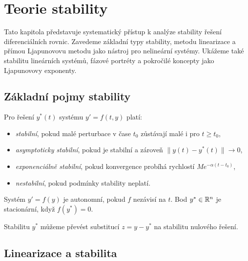 \section{Teorie stability}
\label{sec:teorie-stability}

Tato kapitola představuje systematický přístup k analýze stability řešení diferenciálních rovnic. 
Zavedeme základní typy stability, metodu linearizace a přímou Ljapunovovu metodu jako nástroj pro nelineární systémy. 
Ukážeme také stabilitu lineárních systémů, fázové portréty a pokročilé koncepty jako Ljapunovovy exponenty.

\spc

\subsection{Základní pojmy stability}
\label{sec:zakladni-pojmy-stability}

\begin{definition}
\label{def:stabilita-ljapunov}
Pro řešení $y^*(t)$ systému $y' = f(t,y)$ platí:
\begin{itemize}
\item \emph{stabilní}, pokud malé perturbace v čase $t_0$ zůstávají malé i pro $t \geq t_0$,
\item \emph{asymptoticky stabilní}, pokud je stabilní a zároveň $\|y(t)-y^*(t)\|\to 0$,
\item \emph{exponenciálně stabilní}, pokud konvergence probíhá rychlostí $Me^{-\alpha(t-t_0)}$,
\item \emph{nestabilní}, pokud podmínky stability neplatí.
\end{itemize}
\end{definition}

\begin{definition}
\label{def:autonomni-system}
Systém $y'=f(y)$ je autonomní, pokud $f$ nezávisí na $t$. Bod $y^*\in\mathbb{R}^n$ je stacionární, když $f(y^*)=0$.
\end{definition}

\begin{remark}
\label{rem:stabilita-nuloveho-reseni}
Stabilitu $y^*$ můžeme převést substitucí $z=y-y^*$ na stabilitu nulového řešení.
\end{remark}

\spc

\subsection{Linearizace a stabilita}
\label{sec:linearizace-stabilita}

